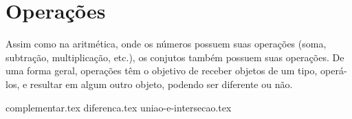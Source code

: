 \section{Operações}
Assim como na aritmética, onde os números possuem suas operações (soma, subtração,  multiplicação, etc.), os conjutos também possuem suas operações.
De uma forma geral, operações têm o objetivo de receber objetos de um tipo, operá-los, e resultar em algum outro objeto, podendo ser diferente ou não.

{complementar.tex}
{diferenca.tex}
{uniao-e-intersecao.tex}

